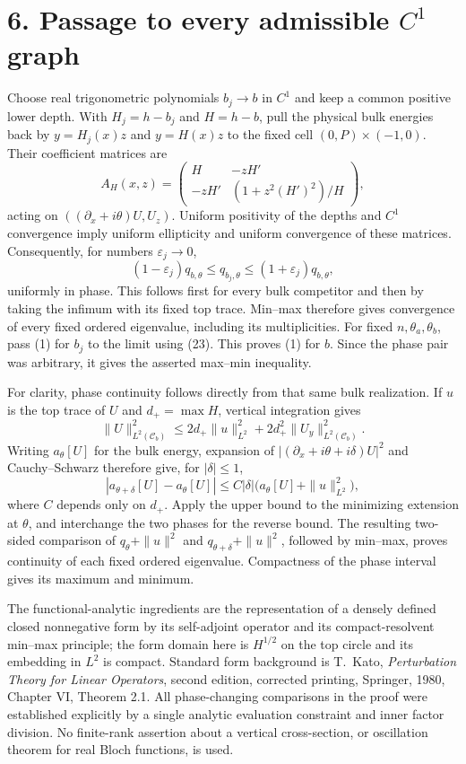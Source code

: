 \documentclass[11pt]{article}
\begin{document}
\section*{6. Passage to every admissible $C^1$ graph}
Choose real trigonometric polynomials $b_j\to b$ in $C^1$ and keep
a common positive lower depth. With $H_j=h-b_j$ and $H=h-b$,
pull the physical bulk energies back by $y=H_j(x)z$ and $y=H(x)z$
to the fixed cell $(0,P)\times(-1,0)$. Their coefficient matrices
are
\[
 A_H(x,z)=
 \begin{pmatrix}
 H&-zH'\\
 -zH'&(1+z^2(H')^2)/H
 \end{pmatrix}, \tag{22}
\]
acting on $((\partial_x+i\theta)U,U_z)$. Uniform positivity of
the depths and $C^1$ convergence imply uniform ellipticity and
uniform convergence of these matrices. Consequently, for numbers
$\varepsilon_j\to0$,
\[
 (1-\varepsilon_j)q_{b,\theta}
 \le q_{b_j,\theta}\le
 (1+\varepsilon_j)q_{b,\theta}, \tag{23}
\]
uniformly in phase. This follows first for every bulk competitor
and then by taking the infimum with its fixed top trace. Min--max
therefore gives convergence of every fixed ordered eigenvalue,
including its multiplicities. For fixed $n,\theta_a,\theta_b$,
pass (1) for $b_j$ to the limit using (23). This proves (1) for
$b$. Since the phase pair was arbitrary, it gives the asserted
max--min inequality.

For clarity, phase continuity follows directly from that same bulk
realization. If $u$ is the top trace of $U$ and $d_+=\max H$, vertical
integration gives
\[
 \|U\|_{L^2(\mathcal C_b)}^2
 \le 2d_+\|u\|_{L^2}^2+2d_+^2\|U_y\|_{L^2(\mathcal C_b)}^2.
\]
Writing $a_\theta[U]$ for the bulk energy, expansion of
$|(\partial_x+i\theta+i\delta)U|^2$ and Cauchy--Schwarz therefore
give, for $|\delta|\le1$,
\[
 |a_{\theta+\delta}[U]-a_\theta[U]|
 \le C|\delta|\bigl(a_\theta[U]+\|u\|_{L^2}^2\bigr),
\]
where $C$ depends only on $d_+$. Apply the upper bound to the
minimizing extension at $\theta$, and interchange the two phases
for the reverse bound. The resulting two-sided comparison of
$q_\theta+\|u\|^2$ and $q_{\theta+\delta}+\|u\|^2$, followed by
min--max, proves continuity of each fixed ordered eigenvalue.
Compactness of the phase interval gives its maximum and minimum.

The functional-analytic ingredients are the representation of a
densely defined closed nonnegative form by its self-adjoint
operator and its compact-resolvent min--max principle; the form
domain here is $H^{1/2}$ on the top circle and its embedding in
$L^2$ is compact. Standard form background is T.~Kato,
\emph{Perturbation Theory for Linear Operators}, second edition,
corrected printing, Springer, 1980, Chapter VI, Theorem 2.1.
All phase-changing comparisons in the proof were established
explicitly by a single analytic evaluation constraint and inner
factor division. No finite-rank assertion about a vertical
cross-section, or oscillation theorem for real Bloch functions,
is used.
\end{document}
